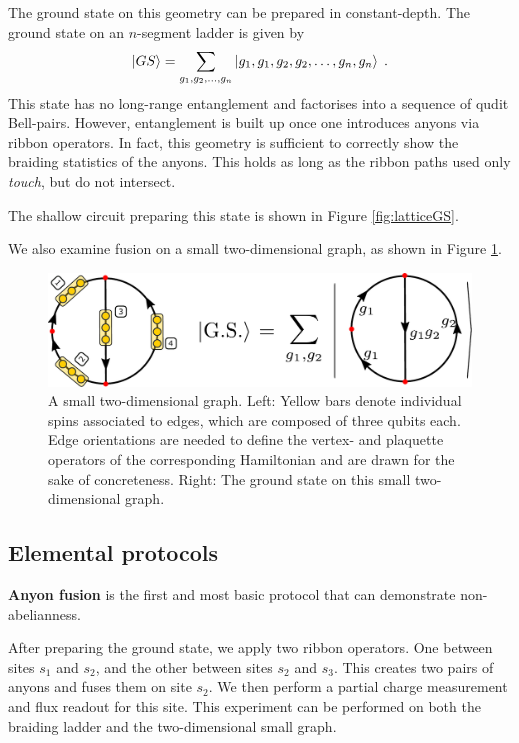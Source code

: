 \documentclass[two column]{article}
\begin{document}
The ground state on this geometry can be prepared in constant-depth. The ground state on an $n$-segment ladder is given by
\begin{equation}
    \ket{GS} = \sum_{g_1,g_2,\ldots,g_n} \ket{g_1,g_1,g_2,g_2,\ldots,g_n,g_n} \;.
\end{equation}
This state has no long-range entanglement and factorises into a sequence of qudit Bell-pairs. 
However, entanglement is built up once one introduces anyons via ribbon operators.
In fact, this geometry is sufficient to correctly show the braiding statistics of the anyons. This holds as long as the ribbon paths used only \emph{touch}, but do not intersect.

The shallow circuit preparing this state is shown in Figure \ref{fig:latticeGS}.

We also examine fusion on a small two-dimensional graph, as shown in Figure \ref{fig:basketball}.

\begin{figure}
    \centering
    \includegraphics[width=\linewidth]{Figures/basketball.pdf}
    \caption{A small two-dimensional graph. Left: Yellow bars denote individual spins associated to edges, which are composed of three qubits each. Edge orientations are needed to define the vertex- and plaquette operators of the corresponding Hamiltonian and are drawn for the sake of concreteness. Right: The ground state on this small two-dimensional graph.}
    \label{fig:basketball}
\end{figure}




\subsection{Elemental protocols}
\textbf{Anyon fusion}
is the first and most basic protocol that can demonstrate non-abelianness. 

After preparing the ground state, we apply two ribbon operators. One between sites $s_1$ and $s_2$, and the other between sites $s_2$ and $s_3$.
This creates two pairs of anyons and fuses them on site $s_2$. We then perform a partial charge measurement and flux readout for this site.
This experiment can be performed on both the braiding ladder and the two-dimensional small graph.
\end{document}
